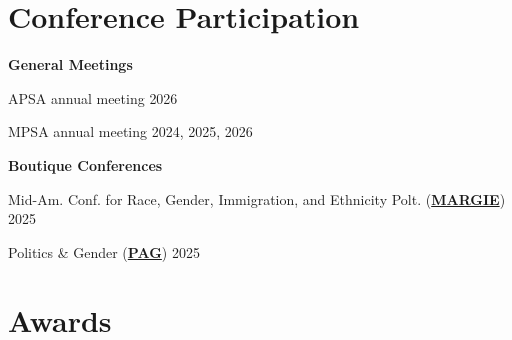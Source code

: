 \documentclass[margin,line,pifont,palatino,courier]{res}
\newenvironment{list1}{
  \begin{list}{\ding{113}}{%
      \setlength{\itemsep}{0in}
      \setlength{\parsep}{0in} \setlength{\parskip}{0in}
      \setlength{\topsep}{0in} \setlength{\partopsep}{0in}
      \setlength{\leftmargin}{0.17in}}}{\end{list}}
\begin{document}
\begin{resume}
\section{\sc Conference Participation}
\textbf{General Meetings}
\begin{list1}
\item[] APSA annual meeting \hfill{2026}
\item[] MPSA annual meeting  \hfill{2024, 2025, 2026} 
\end{list1}
\textbf{Boutique Conferences}
\begin{list1}
\item[] Mid-Am. Conf. for Race, Gender, Immigration, and Ethnicity Polt. (\textbf{\href{https://www.margie.phd/}{MARGIE}}) \hfill{2025}  %
\item[] Politics \& Gender (\textbf{\href{https://www.pagconference.org/}{PAG}}) \hfill {2025}
\end{list1}

\section{\sc Awards}


\end{resume}
\end{document}
